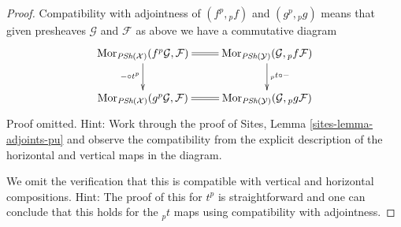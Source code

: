 \documentclass[10pt,a4paper]{amsart}
\theoremstyle{plain}
\theoremstyle{definition}
\theoremstyle{remark}
\numberwithin{equation}{subsection}
\def\Mor{\mathop{\mathrm{Mor}}\nolimits}
\begin{document}
\begin{proof}
\medskip\noindent
Compatibility with adjointness of $(f^p, {}_pf)$ and $(g^p, {}_pg)$ means
that given presheaves $\mathcal{G}$ and $\mathcal{F}$ as above we have
a commutative diagram
$$
\xymatrix{
\Mor_{\textit{PSh}(\mathcal{X})}(f^p\mathcal{G}, \mathcal{F})
\ar@{=}[r] \ar[d]_{- \circ t^p} &
\Mor_{\textit{PSh}(\mathcal{Y})}(\mathcal{G}, {}_pf\mathcal{F})
\ar[d]^{{}_pt \circ -} \\
\Mor_{\textit{PSh}(\mathcal{X})}(g^p\mathcal{G}, \mathcal{F})
\ar@{=}[r] &
\Mor_{\textit{PSh}(\mathcal{Y})}(\mathcal{G}, {}_pg\mathcal{F})
}
$$
Proof omitted. Hint: Work through the proof of
Sites, Lemma \ref{sites-lemma-adjoints-pu}
and observe the compatibility from the explicit description of the
horizontal and vertical maps in the diagram.

\medskip\noindent
We omit the verification that this is compatible with vertical and horizontal
compositions. Hint: The proof of this for $t^p$ is straightforward and
one can conclude that this holds for the ${}_pt$ maps using compatibility
with adjointness.
\end{proof}
\end{document}
